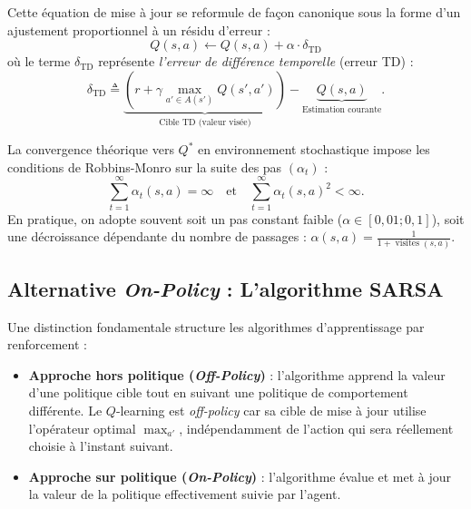 \begin{remark}
    Cette équation de mise à jour se reformule de façon canonique sous la forme d'un ajustement proportionnel à un résidu d'erreur :
    \begin{equation}
        Q(s, a) \longleftarrow Q(s, a) + \alpha \cdot \delta_{\text{TD}}
    \end{equation}
    où le terme $\delta_{\text{TD}}$ représente \emph{l'erreur de différence temporelle} (erreur TD) :
    \begin{equation}
        \delta_{\text{TD}} \triangleq \underbrace{\left( r + \gamma \max_{a' \in A(s')} Q(s', a') \right)}_{\text{Cible TD (valeur visée)}} - \underbrace{Q(s, a)}_{\text{Estimation courante}}.
\end{equation}
\end{remark}

\begin{remark}
    La convergence théorique vers $Q^*$ en environnement stochastique impose les conditions de Robbins-Monro sur la suite des pas $(\alpha_t)$ :
    \begin{equation}
        \sum_{t=1}^\infty \alpha_t(s, a) = \infty \quad \text{et} \quad \sum_{t=1}^\infty \alpha_t(s, a)^2 < \infty.
    \end{equation}
    En pratique, on adopte souvent soit un pas constant faible ($\alpha \in [0{,}01 ; 0{,}1]$), soit une décroissance dépendante du nombre de passages : $\alpha(s, a) = \frac{1}{1 + \operatorname{visites}(s, a)}$.
\end{remark}

\subsection{Alternative \emph{On-Policy} : L'algorithme SARSA}

Une distinction fondamentale structure les algorithmes d'apprentissage par renforcement :
\begin{itemize}
    \item \textbf{Approche hors politique (\emph{Off-Policy})} : l'algorithme apprend la valeur d'une politique cible tout en suivant une politique de comportement différente. Le $Q$-learning est \emph{off-policy} car sa cible de mise à jour utilise l'opérateur optimal $\max_{a'}$, indépendamment de l'action qui sera réellement choisie à l'instant suivant.
    \item \textbf{Approche sur politique (\emph{On-Policy})} : l'algorithme évalue et met à jour la valeur de la politique effectivement suivie par l'agent.
\end{itemize}

